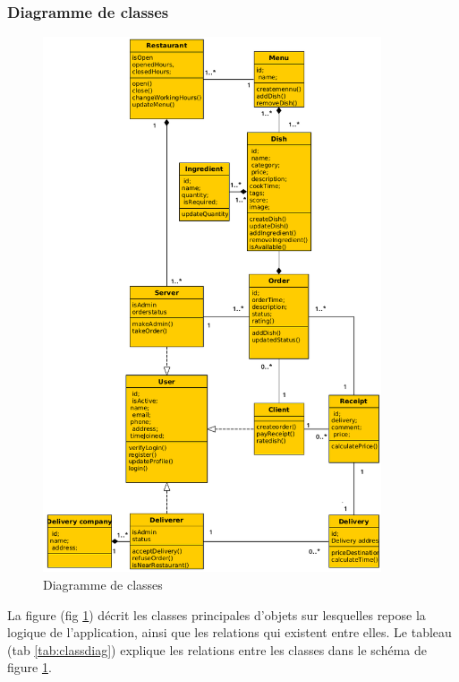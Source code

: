 \documentclass[french, a4paper, 12pt]{report}
\begin{document}
		\subsubsection{Diagramme de classes}
			\begin{figure}[!h]
  				\center
  				\includegraphics[width=10cm]{classdiag.png}
  				\caption{Diagramme de classes}
  				\label{fig:classdiag}
			\end{figure}
			
			La figure (fig \ref{fig:classdiag}) décrit les classes principales d'objets sur lesquelles repose la logique de l'application, ainsi que les relations qui existent entre elles.
			\newpage
			Le tableau (tab \ref{tab:classdiag}) explique les relations entre les classes dans le schéma de figure \ref{fig:classdiag}.
			
\end{document}
